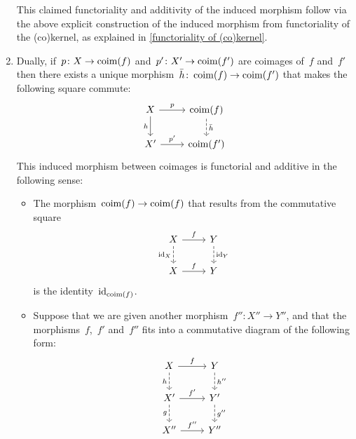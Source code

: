 \begin{remark*}
\begin{enumerate}
\begin{itemize}
      \end{itemize}
      This claimed functoriality and additivity of the induced morphism follow via the above explicit construction of the induced morphism from functoriality of the (co)kernel, as explained in \cref{functoriality of (co)kernel}.
    \item
      Dually, if~$p \colon X \to \operatorname{coim}(f)$ and~$p' \colon X' \to \operatorname{coim}(f')$ are coimages of~$f$ and~$f'$ then there exists a unique morphism~$\bar{h} \colon \operatorname{coim}(f) \to \operatorname{coim}(f')$ that makes the following square commute:
      \[
        \begin{tikzcd}
            X
            \arrow{r}[above]{p}
            \arrow{d}[left]{h}
          & \coim(f)
            \arrow[dashed]{d}[right]{\bar{h}}
          \\
            X'
            \arrow{r}[above]{p'}
          & \coim(f')
        \end{tikzcd}
      \]
      This induced morphism between coimages is functorial and additive in the following sense:
      \begin{itemize}
        \item
          The morphism~$\operatorname{coim}(f) \to \operatorname{coim}(f)$ that results from the commutative square
          \[
            \begin{tikzcd}
                X
                \arrow{r}[above]{f}
                \arrow[dashed]{d}[left]{\id_X}
              & Y
                \arrow[dashed]{d}[right]{\id_Y}
              \\
                X
                \arrow{r}[above]{f}
              & Y
            \end{tikzcd}
          \]
          is the identity~$\operatorname{id}_{\operatorname{coim}(f)}$.
        \item
          Suppose that we are given another morphism~$f'' \colon X'' \to Y''$, and that the morphisms~$f$,~$f'$ and~$f''$ fits into a commutative diagram of the following form:
          \[
            \begin{tikzcd}
                X
                \arrow{r}[above]{f}
                \arrow[dashed]{d}[left]{h}
              & Y
                \arrow[dashed]{d}[right]{h''}
              \\
                X'
                \arrow{r}[above]{f'}
                \arrow[dashed]{d}[left]{g}
              & Y'
                \arrow[dashed]{d}[right]{g''}
              \\
                X''
                \arrow{r}[above]{f''}
              & Y''
            \end{tikzcd}
\]
\end{itemize}
\end{enumerate}
\end{remark*}
